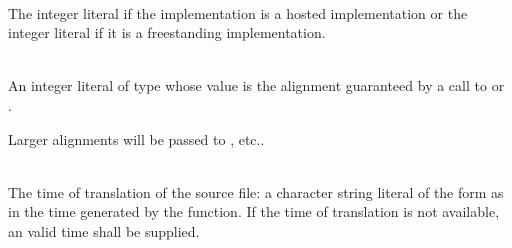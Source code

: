 \begin{description}
\item
{}%
%
%
\\
The integer literal 
if the implementation is a hosted implementation or
the integer literal 
if it is a freestanding implementation.

\item
{}%
\\
An integer literal of type 
whose value is the alignment guaranteed
by a call to 
or .
\begin{note}
Larger alignments will be passed to
, etc..
\end{note}

\item
{}%
\\
The time of translation of the source file:
a character string literal of the form
as in the time generated by the
function.
If the time of translation is not available,
an  valid time shall be supplied.
\end{description}

